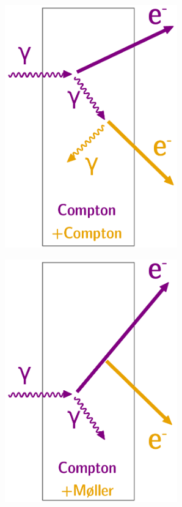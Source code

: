 \begin{figure}[!h]
\begin{subfigure}[t]{0.32\textwidth}
  \includegraphics[width=0.82\textwidth]{SNdemonstrator/fig_SNdemonstrator/external_contamination_double_compton.pdf}
  \captionsetup{justification=justified}
  \caption{
    \label{subfig:ext_cont_compton}}
\end{subfigure}
\hfill
\begin{subfigure}[t]{0.32\textwidth}
  \centering
  \includegraphics[width=0.82\textwidth]{SNdemonstrator/fig_SNdemonstrator/external_contamination_compton_moller.pdf}

\end{subfigure}
\end{figure}
